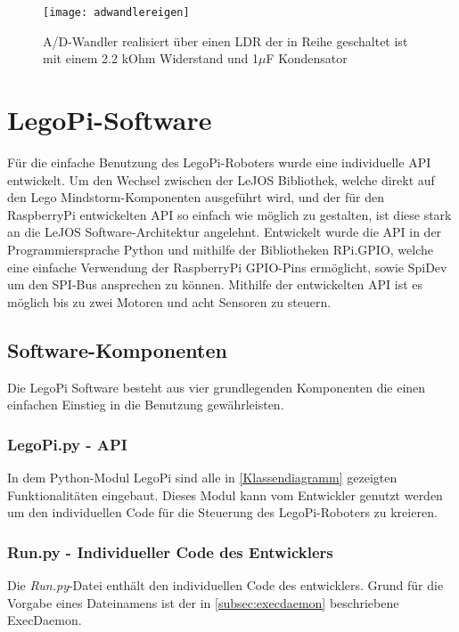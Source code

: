 \begin{figure}[h]
  \centering
  \texttt{[image: adwandlereigen]}
  \caption{A/D-Wandler realisiert über einen LDR der in Reihe geschaltet ist mit einem 2.2 kOhm Widerstand und 1$\mu$F Kondensator}
  \label{Kap1:Lightsensor}
\end{figure}

\chapter{LegoPi-Software}
\label{Kap3}

Für die einfache Benutzung des LegoPi-Roboters wurde eine individuelle API entwickelt. Um den Wechsel zwischen der LeJOS Bibliothek, welche direkt auf den Lego Mindstorm-Komponenten ausgeführt wird, und der für den RaspberryPi entwickelten API so einfach wie möglich zu gestalten, ist diese stark an die LeJOS Software-Architektur angelehnt. Entwickelt wurde die API in der Programmiersprache Python und mithilfe der Bibliotheken RPi.GPIO, welche eine einfache Verwendung der RaspberryPi GPIO-Pins ermöglicht, sowie SpiDev um den SPI-Bus ansprechen zu können. Mithilfe der entwickelten API ist es möglich bis zu zwei Motoren und acht Sensoren zu steuern.

\section{Software-Komponenten}

Die LegoPi Software besteht aus vier grundlegenden Komponenten die einen einfachen Einstieg in die Benutzung gewährleisten.

\subsection{LegoPi.py - API}

In dem Python-Modul LegoPi sind alle in \autoref{Klassendiagramm} gezeigten Funktionalitäten eingebaut. Dieses Modul kann vom Entwickler genutzt werden um den individuellen Code für die Steuerung des LegoPi-Roboters zu kreieren.  

\subsection{Run.py - Individueller Code des Entwicklers}

Die \emph{Run.py}-Datei enthält den individuellen Code des entwicklers. Grund für die Vorgabe eines Dateinamens ist der in \autoref{subsec:execdaemon} beschriebene ExecDaemon.

